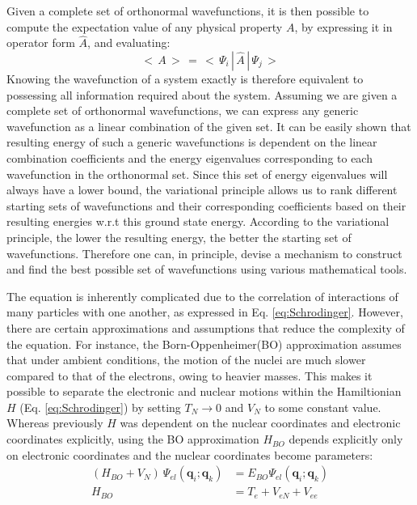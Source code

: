             Given a complete set of orthonormal wavefunctions, it is then possible to compute the expectation value of any physical property $A$, by expressing it in operator form $\hat{A}$, and evaluating:
            \begin{equation}\label{eq:expectation value}
                <\,A\,>\, =\, < \,\Psi_i\,|\,\hat{A}\,|\, \Psi_j\,>
            \end{equation}
            Knowing the wavefunction of a system exactly is therefore equivalent to possessing all information required about the system. Assuming we are given a complete set of orthonormal wavefunctions, we can express any generic wavefunction as a linear combination of the given set. It can be easily shown that resulting energy of such a generic wavefunctions is dependent on the linear combination coefficients and the energy eigenvalues corresponding to each wavefunction in the orthonormal set. Since this set of energy eigenvalues will always have a lower bound, the variational principle allows us to rank different starting sets of wavefunctions and their corresponding coefficients based on their resulting energies w.r.t this ground state energy. According to the variational principle, the lower the resulting energy, the better the starting set of wavefunctions. Therefore one can, in principle, devise a mechanism to construct and find the best possible set of wavefunctions using various mathematical tools.

            The \Schrodinger{} equation is inherently complicated due to the correlation of interactions of many particles with one another, as expressed in Eq. \eqref{eq:Schrodinger}. However, there are certain approximations and assumptions that reduce the complexity of the equation. For instance, the Born-Oppenheimer(BO) approximation assumes that under ambient conditions, the motion of the nuclei are much slower compared to that of the electrons, owing to heavier masses. This makes it possible to separate the electronic and nuclear motions within the Hamiltionian $H$ (Eq. \eqref{eq:Schrodinger}) by setting $T_N \to 0$ and $V_N$ to some constant value. Whereas previously $H$ was dependent on the nuclear coordinates and electronic coordinates explicitly, using the BO approximation $H_{BO}$ depends explicitly only on electronic coordinates and the nuclear coordinates become parameters:
            \begin{equation}\label{eq:BO approximation}
                \begin{aligned}
                    (H_{BO} + V_N)~\Psi_{el} (\mathbf{q}_i;\mathbf{q}_k) &= E_{BO} \Psi_{el} (\mathbf{q}_i;\mathbf{q}_k)\\
                    H_{BO} &= T_e + V_{eN} + V_{ee}
                \end{aligned}
            \end{equation}

